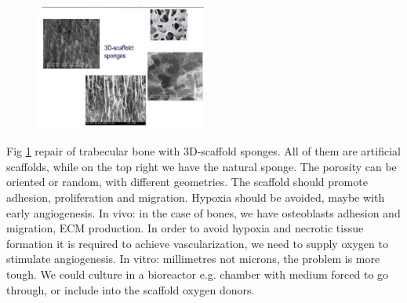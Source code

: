 \begin{figure}[h]
\centering
\includegraphics[width=0.5\textwidth]{sponge.jpg}
\caption{\label{fig:sponge}}
\end{figure}
\noindent
Fig \ref{fig:sponge} repair of trabecular bone with 3D-scaffold sponges. 
All of them are artificial scaffolds, while on the top right we have the natural sponge. 
The porosity can be oriented or random, with different geometries.
The scaffold should promote adhesion, proliferation and migration. Hypoxia should be avoided, maybe with early angiogenesis. 
In vivo: in the case of bones, we have osteoblasts adhesion and migration, ECM production. In order to avoid hypoxia and necrotic tissue formation it is required to achieve vascularization, we need to supply oxygen to stimulate angiogenesis. 
In vitro: millimetres not microns, the problem is more tough. We could culture in a bioreactor e.g. chamber with medium forced to go through, or include into the scaffold oxygen donors.

